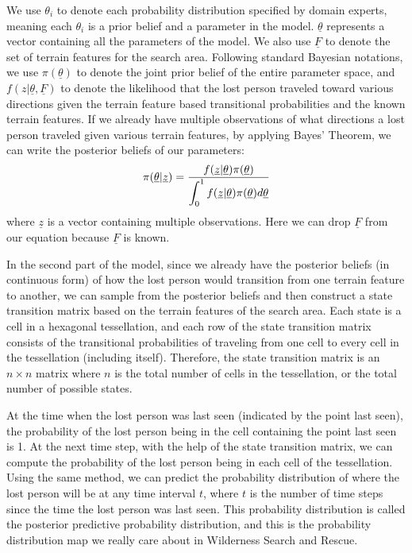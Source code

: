\documentclass[smallextended,natbib]{svjour3}
\begin{document}
We use $\theta_i$ to denote each probability distribution specified by domain experts, meaning each $\theta_i$ is a prior belief and a parameter in the model. $\underline{\theta}$ represents a vector containing all the parameters of the model. We also use $\underline{F}$ to denote the set of terrain features for the search area. Following standard Bayesian notations, we use $\pi(\underline{\theta})$ to denote the joint prior belief of the entire parameter space, and $f(z|\underline{\theta}, \underline{F})$ to denote the likelihood that the lost person traveled toward various directions given the terrain feature based transitional probabilities and the known terrain features. If we already have multiple observations of what directions a lost person traveled given various terrain features, by applying Bayes' Theorem, we can write the posterior beliefs of our parameters:
\begin{align}
\label{BayesTherom}
\pi(\underline{\theta}|\underline{z})=\frac{f(\underline{z}|\underline{\theta})\pi(\underline{\theta})}{\displaystyle\displaystyle\int^{1}_{0} f(\underline{z}|\underline{\theta})\pi(\underline{\theta})d\underline{\theta}}
\end{align}
where $\underline{z}$ is a vector containing multiple observations. Here we can drop $\underline{F}$ from our equation because $\underline{F}$ is known.

In the second part of the model, since we already have the posterior beliefs (in continuous form) of how the lost person would transition from one terrain feature to another, we can sample from the posterior beliefs and then construct a state transition matrix based on the terrain features of the search area. Each state is a cell in a hexagonal tessellation, and each row of the state transition matrix consists of the transitional probabilities of traveling from one cell to every cell in the tessellation (including itself). Therefore, the state transition matrix is an $n \times n$ matrix where $n$ is the total number of cells in the tessellation, or the total number of possible states.

At the time when the lost person was last seen (indicated by the point last seen), the probability of the lost person being in the cell containing the point last seen is 1. At the next time step, with the help of the state transition matrix, we can compute the probability of the lost person being in each cell of the tessellation. Using the same method, we can predict the probability distribution of where the lost person will be at any time interval $t$, where $t$ is the number of time steps since the time the lost person was last seen. This probability distribution is called the posterior predictive probability distribution, and this is the probability distribution map we really care about in Wilderness Search and Rescue.
\end{document}
